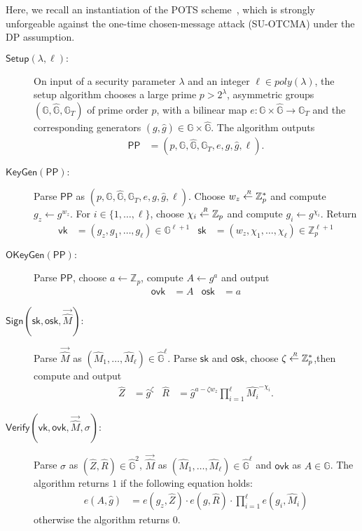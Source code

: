 \documentclass[10pt]{llncs}
\newcommand{\G}{\mathbb{G}}
\newcommand{\sk}{\mathsf{sk}}
\newcommand{\vk}{\mathsf{vk}}
\newcommand{\ovk}{\mathsf{ovk}}
\newcommand{\osk}{\mathsf{osk}}
\newcommand{\sample}{\stackrel{{\scriptscriptstyle \mkern4mu R}}{\gets}}
\newcommand{\Setup}{{\mathsf{Setup}}}
\newcommand{\KeyGen}{{\mathsf{KeyGen}}}
\newcommand{\OKeyGen}{{\mathsf{OKeyGen}}}
\newcommand{\PPP}{\mathsf{PP}}
\begin{document}
	
Here, we recall an instantiation of the POTS scheme~\cite{DBLP:conf/asiacrypt/AbeCDKNO12},
which is strongly unforgeable against the one-time chosen-message attack (SU-OTCMA) under the DP assumption.  %
%
\begin{description}
\item[\boldmath$\Setup(\lambda, \ell):$] On input of a security parameter $\lambda$ and an integer $\ell \in poly(\lambda)$, 
  the setup algorithm chooses a large prime $p > 2^\lambda$, 
  asymmetric groups $(\G, \hat{\G}, \G_T)$ of prime order $p$, with a bilinear map $e : \G \times \hat{\G} \to \G_T$
  and the corresponding  generators $(g, \hat{g} ) \in \G \times \hat{\G}$.
  The algorithm outputs
  \begin{align*}
  \PPP & = (p, \G, \hat{\G}, \G_T, e, g, \hat{g}, \ell).
  \end{align*}

\item[\boldmath$\KeyGen(\PPP):$] Parse $\PPP$ as 
  $(p, \G, \hat{\G}, \G_T, e, g, \hat{g}, \ell)$. 
  Choose $w_z \sample \mathbb{Z}_p^*$ and compute $g_z \gets g^{w_z}$.
  For $i \in \{1, \dots, \ell\}$, choose $\chi_i \sample \mathbb{Z}_p$ 
  and compute $g_i \gets g^{\chi_i}$.
 Return 
  \begin{align*}
    \vk &= (g_z, g_1, \dots, g_\ell) \in \G^{\ell+1} &
    \sk &= (w_z, \chi_1, \dots, \chi_\ell) \in\mathbb{Z}_p^{\ell+1}
  \end{align*}
\item[\boldmath$\OKeyGen(\PPP):$] Parse $\PPP$, choose $a \gets \mathbb{Z}_p$, 
  compute $A \gets g^a$ and output
  \begin{align*}
    \ovk &= A & \osk &= a
  \end{align*}
\item[\boldmath$\mathsf{Sign}(\sk, \osk, \vec{\hat{M}}):$] Parse $\vec{\hat{M}}$ as  
  $(\hat{M}_1, \dots, \hat{M}_{\ell}) \in \hat{\G}^{\ell}$.
  Parse $\sk$ and $\osk$, choose $\zeta \sample \mathbb{Z}_p^*$,then 
  compute and output
  \begin{align*}
    \hat{Z} &= \hat{g}^\zeta & 
    \hat{R} &= \hat{g}^{a - \zeta w_z} 
               \mbox{$\prod_{i=1}^\ell$} \hat{M_i}^{-\chi_i}.
  \end{align*}
\item[\boldmath$\mathsf{Verify}(\vk, \ovk, \vec{\hat{M}}, \sigma):$] 
  Parse $\sigma$ as $(\hat{Z}, \hat{R}) \in \hat{\G}^2$, 
  $\vec{\hat{M}}$ as $(\hat{M}_1, \dots, \hat{M}_\ell) \in \hat{\G}^\ell$ 
  and $\ovk$ as $A \in \G$.
  The algorithm returns $1$ if the following equation holds:
  \begin{align*}
    e(A, \hat{g}) &= e(g_z, \hat{Z}) \cdot e(g, \hat{R}) 
                     \cdot \prod_{i = 1}^{\ell} e(g_i, \hat{M}_i)
  \end{align*}
  otherwise the algorithm returns $0$.

\end{description}
	
\end{document}
